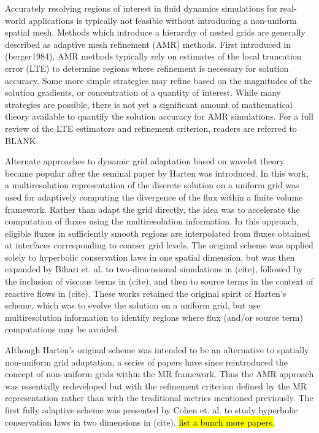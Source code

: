 \documentclass[]{article}
\begin{document}
    Accurately resolving regions of interest in fluid dynamics simulations for
    real-world applications is typically not feasible without introducing a
    non-uniform spatial mesh. Methods which introduce a hierarchy of nested
    grids are generally described as adaptive mesh refinement (AMR) methods.
    First introduced in (berger1984), AMR methods typically rely on estimates
    of the local truncation error (LTE) to determine regions where refinement
    is necessary for solution accuracy. Some more simple strategies may refine
    based on the magnitudes of the solution gradients, or concentration of a
    quantity of interest. While many strategies are possible, there is not yet
    a significant amount of mathematical theory available to quantify the
    solution accuracy for AMR simulations. For a full review of the LTE
    estimators and refinement criterion, readers are referred to BLANK.

    Alternate approaches to dynamic grid adaptation based on wavelet theory
    became popular after the seminal paper by Harten \cite{harten1994} was
    introduced. In this work, a multiresolution representation of the discrete
    solution on a uniform grid was used for adaptively computing the divergence
    of the flux within a finite volume framework. Rather than adapt the grid
    directly, the idea was to accelerate the computation of fluxes using the
    multiresolution information. In this approach, eligible fluxes in
    sufficiently smooth regions are interpolated from fluxes obtained at
    interfaces corresponding to coarser grid levels. The original scheme was
    applied solely to hyperbolic conservation laws in one spatial dimension,
    but was then expanded by Bihari et. al. to two-dimensional simulations in (cite),
    followed by the inclusion of viscous terms in (cite), and then to source terms in
    the context of reactive flows in (cite). These works retained the
    original spirit of Harten's scheme, which was to evolve the solution on a
    uniform grid, but use multiresolution information to identify regions where
    flux (and/or source term) computations may be avoided.

    Although Harten's original scheme was intended to be an alternative to
    spatially non-uniform grid adaptation, a series of papers have since
    reintroduced the concept of non-uniform grids within the MR framework. Thus
    the AMR approach was essentially redeveloped but with the refinement
    criterion defined by the MR representation rather than with the traditional
    metrics mentioned previously. The first fully adaptive scheme was presented
    by Cohen et. al. to study hyperbolic conservation laws in two dimensions in
    (cite). \hl{list a bunch more papers.}
\end{document}
